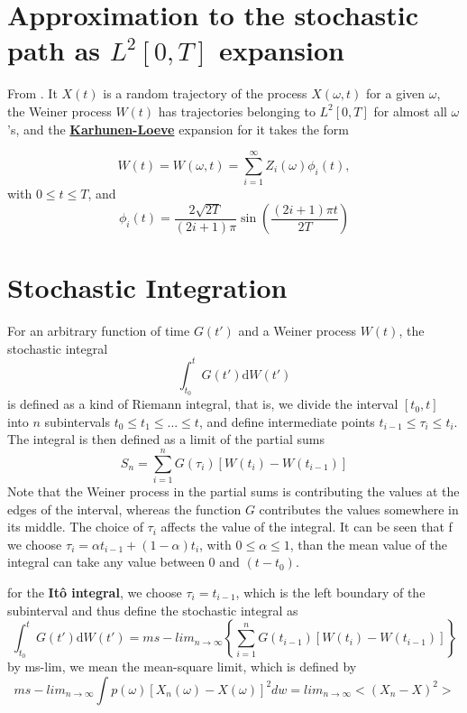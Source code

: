 \documentclass[12pt]{report}
\begin{document}
\section{Approximation to the stochastic path as $L^2[0,T]$ expansion}
From \cite{iacus2009simulation}. It $X(t)$ is a random trajectory of the process $X(\omega, t)$ for a given $\omega$, the Weiner process $W(t)$ has trajectories belonging to $L^2[0,T]$ for almost all $\omega$'s, and the \textbf{\href{http://en.wikipedia.org/wiki/Karhunen-Loeve_theorem}{Karhunen-Loeve}} expansion for it takes the form 

\begin{equation*}
W(t)=W(\omega,t)= \sum_{i=1}^\infty Z_i(\omega)\phi_i(t), 
\end{equation*}
with $0\leq t \leq T$, and 
\begin{equation*}
\phi_i(t) = \frac{2\sqrt{2T}}{(2i+1)\pi} \sin \left(\frac{(2i+1)\pi t}{2T} \right)
\end{equation*}

\section{Stochastic Integration}
For an arbitrary function of time $G(t')$ and a Weiner process $W(t)$, the stochastic integral 
\begin{equation*}
\int_{t_0}^t G(t')\mathrm{d}W(t')
\end{equation*}
is defined as a kind of Riemann integral, that is, we divide the interval $[t_0,t]$ into $n$ subintervals $t_0\leq t_1\leq ...\leq t$, and define intermediate points $t_{i-1}\leq\tau_i\leq t_{i}$. The integral is then defined as a limit of the partial sums 
\begin{equation*}
S_n=\sum_{i=1}^nG(\tau_i)[W(t_i)-W(t_{i-1})]
\end{equation*}
Note that the Weiner process in the partial sums is contributing the values at the edges of the interval, whereas the function $G$ contributes the values somewhere in its middle.
The choice of $\tau_i$ affects the value of the integral. It can be seen that f we choose $\tau_i=\alpha t_{i-1}+(1-\alpha)t_i$, with $0\leq \alpha\leq 1$,  than the mean value of the integral can take any value between 0 and $(t-t_0)$. 

for the \textbf{It\^{o} integral}, we choose $\tau_i=t_{i-1}$, which is the left boundary of the subinterval and thus define the stochastic integral as
\begin{equation*}
\int_{t_0}^{t}G(t')\mathrm{d}W(t')=ms-lim_{n\rightarrow\infty}\left\{\sum_{i=1}^nG(t_{i-1})[W(t_{i})-W(t_{i-1})] \right\}
\end{equation*}
by ms-lim, we mean the mean-square limit, which is defined by 
\begin{equation*}
ms-lim_{n\rightarrow\infty}\int p(\omega)[X_n(\omega)-X(\omega)]^2dw= lim_{n\rightarrow \infty}<(X_n-X)^2>
\end{equation*}
\end{document}
